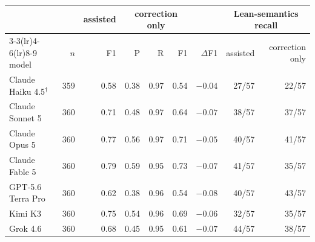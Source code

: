 \begin{tabular}{lrrrrrrrr}
\toprule
 & & assisted & \multicolumn{3}{c}{correction only} & & \multicolumn{2}{c}{Lean-semantics recall} \\
\cmidrule(lr){3-3}\cmidrule(lr){4-6}\cmidrule(lr){8-9}
model & $n$ & F1 & P & R & F1 & $\Delta$F1 & assisted & correction only \\
\midrule
    Claude Haiku 4.5$^{\dagger}$ & 359 & 0.58 & 0.38 & 0.97 & 0.54 & $-0.04$ & 27/57 & 22/57 \\
    Claude Sonnet 5 & 360 & 0.71 & 0.48 & 0.97 & 0.64 & $-0.07$ & 38/57 & 37/57 \\
    Claude Opus 5 & 360 & 0.77 & 0.56 & 0.97 & 0.71 & $-0.05$ & 40/57 & 41/57 \\
    Claude Fable 5 & 360 & 0.79 & 0.59 & 0.95 & 0.73 & $-0.07$ & 41/57 & 35/57 \\
    GPT-5.6 Terra Pro & 360 & 0.62 & 0.38 & 0.96 & 0.54 & $-0.08$ & 40/57 & 43/57 \\
    Kimi K3 & 360 & 0.75 & 0.54 & 0.96 & 0.69 & $-0.06$ & 32/57 & 35/57 \\
    Grok 4.6 & 360 & 0.68 & 0.45 & 0.95 & 0.61 & $-0.07$ & 44/57 & 38/57 \\
\bottomrule
\end{tabular}
